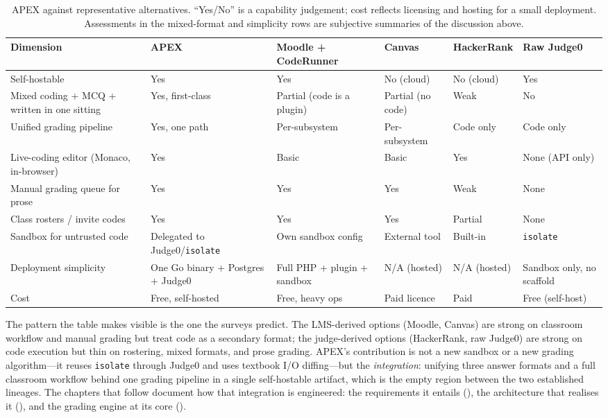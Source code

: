 \begin{table}[H]
  \centering
  \caption{APEX against representative alternatives. ``Yes/No'' is a capability judgement;
  cost reflects licensing and hosting for a small deployment. Assessments in the mixed-format
  and simplicity rows are subjective summaries of the discussion above.}
  \label{tab:bg-comparison}
  \small
  \renewcommand{\arraystretch}{1.3}
  \begin{tabularx}{\linewidth}{L{3.5cm} C{1.9cm} C{2.1cm} C{1.7cm} C{1.9cm} X}
    \toprule
    \textbf{Dimension} & \textbf{APEX} & \textbf{Moodle + CodeRunner} & \textbf{Canvas} &
    \textbf{Hacker\-Rank} & \textbf{Raw Judge0} \\
    \midrule
    Self-hostable
      & Yes & Yes & No (cloud) & No (cloud) & Yes \\
    Mixed coding + MCQ + written in one sitting
      & Yes, first-class & Partial (code is a plugin) & Partial (no code) & Weak & No \\
    Unified grading pipeline
      & Yes, one path & Per-subsystem & Per-subsystem & Code only & Code only \\
    Live-coding editor (Monaco, in-browser)
      & Yes & Basic & Basic & Yes & None (API only) \\
    Manual grading queue for prose
      & Yes & Yes & Yes & Weak & None \\
    Class rosters / invite codes
      & Yes & Yes & Yes & Partial & None \\
    Sandbox for untrusted code
      & Delegated to Judge0/\texttt{isolate} & Own sandbox config & External tool & Built-in &
        \texttt{isolate} \\
    Deployment simplicity
      & One Go binary + Postgres + Judge0 & Full PHP + plugin + sandbox & N/A (hosted) &
        N/A (hosted) & Sandbox only, no scaffold \\
    Cost
      & Free, self-hosted & Free, heavy ops & Paid licence & Paid & Free (self-host) \\
    \bottomrule
  \end{tabularx}
\end{table}

The pattern the table makes visible is the one the surveys predict. The LMS-derived
options (Moodle, Canvas) are strong on classroom workflow and manual grading but treat code
as a secondary format; the judge-derived options (HackerRank, raw Judge0) are strong on code
execution but thin on rostering, mixed formats, and prose grading. APEX's contribution is
not a new sandbox or a new grading algorithm---it reuses \texttt{isolate} through Judge0 and
uses textbook I/O diffing---but the \emph{integration}: unifying three answer formats and a
full classroom workflow behind one grading pipeline in a single self-hostable artifact,
which is the empty region between the two established lineages. The chapters that follow
document how that integration is engineered: the requirements it entails
(), the architecture that realises it (), and the grading
engine at its core ().
